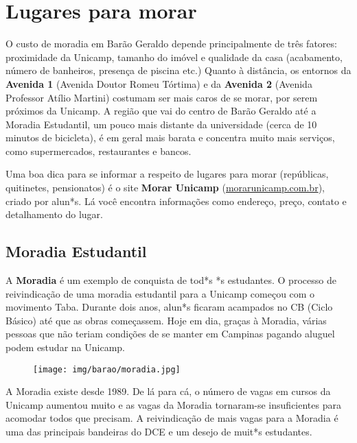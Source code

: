 
\section{Lugares para morar}

O custo de moradia em Barão Geraldo depende principalmente de três fatores:
proximidade da Unicamp, tamanho do imóvel e qualidade da casa (acabamento,
número de banheiros, presença de piscina etc.) Quanto à distância, os entornos
da \textbf{Avenida 1} (Avenida Doutor Romeu Tórtima) e da \textbf{Avenida 2}
(Avenida Professor Atílio Martini) costumam ser mais caros de se morar, por
serem próximos da Unicamp. A região que vai do centro de Barão Geraldo até a
Moradia Estudantil, um pouco mais distante da universidade (cerca de 10 minutos
de bicicleta), é em geral mais barata e concentra muito mais serviços, como
supermercados, restaurantes e bancos.

Uma boa dica para se informar a respeito de lugares para morar (repúblicas,
quitinetes, pensionatos) é o site \textbf{Morar Unicamp}
(\url{morarunicamp.com.br}), criado por alun*s. Lá você encontra informações
como endereço, preço, contato e detalhamento do lugar.

\subsection{Moradia Estudantil}

A \textbf{Moradia} é um exemplo de conquista de tod*s *s estudantes. O processo
de reivindicação de uma moradia estudantil para a Unicamp começou com o
movimento Taba. Durante dois anos, alun*s ficaram acampados no CB (Ciclo Básico)
até que as obras começassem. Hoje em dia, graças à Moradia, várias pessoas que
não teriam condições de se manter em Campinas pagando aluguel podem estudar na
Unicamp.

\begin{figure}[h!]
    \centering
    \texttt{[image: img/barao/moradia.jpg]}
\end{figure}

A Moradia existe desde 1989. De lá para cá, o número de vagas em cursos da
Unicamp aumentou muito e as vagas da Moradia tornaram-se insuficientes para
acomodar todos que precisam. A reivindicação de mais vagas para a Moradia é uma
das principais bandeiras do DCE e um desejo de muit*s estudantes.

